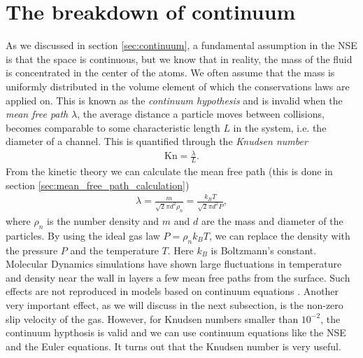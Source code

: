 \section{The breakdown of continuum}
\label{sec:continuum_breakdown}
As we discussed in section \ref{sec:continuum}, a fundamental assumption in the NSE is that the space is continuous, but we know that in reality, the mass of the fluid is concentrated in the center of the atoms. We often assume that the mass is uniformly distributed in the volume element of which the conservations laws are applied on. This is known as the \textit{continuum hypothesis} and is invalid when the \textit{mean free path} $\lambda$, the average distance a particle moves between collisions, becomes comparable to some characteristic length $L$ in the system, i.e. the diameter of a channel\cite{karniadakis2005microflows}. This is quantified through the \textit{Knudsen number}
\begin{align}
	\text{Kn} = \frac{\lambda}{L}.
\end{align}
From the kinetic theory we can calculate the mean free path (this is done in section \ref{sec:mean_free_path_calculation})
\begin{align}
	\lambda = \frac{m}{\sqrt 2 \pi d^2 \rho_n} = \frac{k_B T}{\sqrt 2 \pi d^2 P},
\end{align}
where $\rho_n$ is the number density and $m$ and $d$ are the mass and diameter of the particles. By using the ideal gas law $P = \rho_n k_BT$, we can replace the density with the pressure $P$ and the temperature $T$. Here $k_B$ is Boltzmann's constant. Molecular Dynamics simulations have shown large fluctuations in temperature and density near the wall in layers a few mean free paths from the surface. Such effects are not reproduced in models based on continuum equations \cite{karniadakis2005microflows}. Another very important effect, as we will discuss in the next subsection, is the non-zero slip velocity of the gas. However, for Knudsen numbers smaller than $10^{-2}$, the continuum hypthosis is valid and we can use continuum equations like the NSE and the Euler equations. It turns out that the Knudsen number is very useful.

